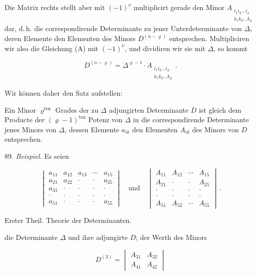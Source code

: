 \documentclass[11pt]{article}
\providecommand{\weberpage}[1]{}
\let\Delta\varDelta
\begin{document}
Die Matrix rechts stellt aber mit $(-1)^{\nu}$ multiplicirt gerade den Minor $A_{\substack{i_1 i_2 \ldots i_\varrho\\k_1 k_2 \ldots k_\varrho}}$ dar, d.\,h. die correspondirende Determinante zu jener Unterdeterminante von $\Delta$, deren Elemente den Elementen des Minors $D^{(n-\varrho)}$ entsprechen. Multipliciren wir also die Gleichung (A) mit $(-1)^{\nu}$, und dividiren wir sie mit $\Delta$, so kommt

\[
D^{(n-\varrho)} = \Delta^{\varrho-1}\cdot A_{\substack{i_1 i_2 \ldots i_\varrho\\k_1 k_2 \ldots k_\varrho}}\, .
\]

Wir können daher den Satz aufstellen:

\glqq Ein Minor $\varrho^{\mathrm{ten}}$ Grades der zu $\Delta$ adjungirten Determinante $D$ ist gleich dem Producte der $(\varrho-1)^{\mathrm{ten}}$ Potenz von $\Delta$ in die correspondirende Determinante jenes Minors von $\Delta$, dessen Elemente $a_{ik}$ den Elementen $A_{ik}$ des Minors von $D$ entsprechen.\grqq{}

89. \textit{Beispiel.} Es seien

\[
\begin{vmatrix}
a_{11} & a_{12} & a_{13} & \cdots & a_{15} \\
a_{21} & a_{22} & \cdot & \cdot & a_{25} \\
a_{31} & \cdot & \cdot & \cdot & \cdot \\
\cdot & \cdot & \cdot & \cdot & \cdot \\
a_{51} & \cdot & \cdot & \cdot & a_{55}
\end{vmatrix}
\quad\text{und}\quad
\begin{vmatrix}
A_{11} & A_{12} & \cdots & A_{15} \\
A_{21} & \cdot & \cdot & A_{25} \\
\cdot & \cdot & \cdot & \cdot \\
\cdot & \cdot & \cdot & \cdot \\
A_{51} & A_{52} & \cdots & A_{55}
\end{vmatrix}\, .
\]


\weberpage{94}
Erster Theil. Theorie der Determinanten.

die Determinante $\Delta$ und ihre adjungirte $D$; der Werth des Minors

\[
D^{(3)} =
\begin{vmatrix}
A_{31} & A_{32} \\
A_{41} & A_{42}
\end{vmatrix}
\]
\end{document}
